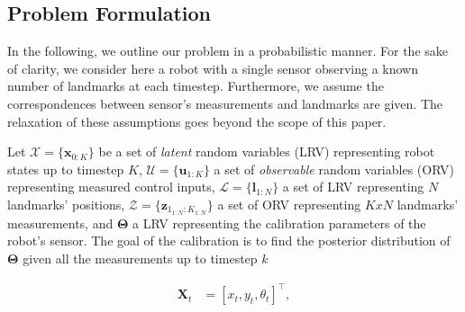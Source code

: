 \subsection{Problem Formulation\label{subsec:prob}}

In the following, we outline our problem in a probabilistic manner. For the
sake of clarity, we consider here a robot with a single sensor observing
a known number of landmarks at each timestep. Furthermore, we assume the
correspondences between sensor's measurements and landmarks are given. The
relaxation of these assumptions goes beyond the scope of this paper.

Let
$\mathcal{X}=\{\mathbf{x}_{0:K}\}$ be a set of \emph{latent} random variables
(LRV) representing robot states up to timestep $K$,
$\mathcal{U}=\{\mathbf{u}_{1:K}\}$ a set of \emph{observable} random variables
(ORV) representing measured control inputs, $\mathcal{L}=\{\mathbf{l}_{1:N}\}$ a
set of LRV representing $N$ landmarks' positions,
$\mathcal{Z}=\{\mathbf{z}_{1_{1:N}:K_{1:N}}\}$ a set of ORV representing $KxN$
landmarks' measurements, and $\boldsymbol{\Theta}$ a LRV representing the
calibration parameters of the robot's sensor. The goal of the calibration is
to find the posterior distribution of $\boldsymbol{\Theta}$ given all the
measurements up to timestep $k$

\begin{equation}
  \begin{aligned}
  \mathbf{X}_t &= [x_t, y_t, \theta_t]^\intercal,
  \end{aligned}
\end{equation}
